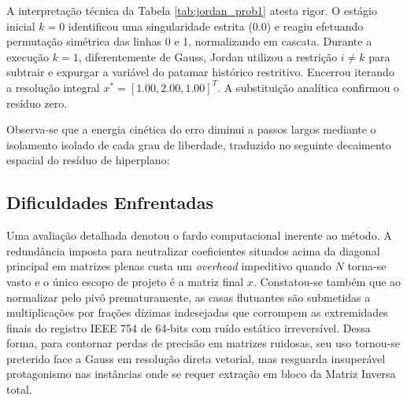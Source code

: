 A interpretação técnica da Tabela \ref{tab:jordan_prob1} atesta rigor. O estágio inicial $k=0$ identificou uma singularidade estrita ($0.0$) e reagiu efetuando permutação simétrica das linhas 0 e 1, normalizando em cascata. Durante a execução $k=1$, diferentemente de Gauss, Jordan utilizou a restrição $i \neq k$ para subtrair e expurgar a variável do patamar histórico restritivo. Encerrou iterando a resolução integral $x^* =[1.00, 2.00, 1.00]^T$. A substituição analítica confirmou o resíduo zero.

Observa-se que a energia cinética do erro diminui a passos largos mediante o isolamento isolado de cada grau de liberdade, traduzido no seguinte decaimento espacial do resíduo de hiperplano:

\begin{center}
\end{center}

\subsection{Dificuldades Enfrentadas}

Uma avaliação detalhada denotou o fardo computacional inerente ao método. A redundância imposta para neutralizar coeficientes situados acima da diagonal principal em matrizes plenas custa um \textit{overhead} impeditivo quando $N$ torna-se vasto e o único escopo de projeto é a matriz final $x$. Constatou-se também que ao normalizar pelo pivô prematuramente, as casas flutuantes são submetidas a multiplicações por frações dízimas indesejadas que corrompem as extremidades finais do registro IEEE 754 de 64-bits com ruído estático irreversível. Dessa forma, para contornar perdas de precisão em matrizes ruidosas, seu uso tornou-se preterido face a Gauss em resolução direta vetorial, mas resguarda insuperável protagonismo nas instâncias onde se requer extração em bloco da Matriz Inversa total.